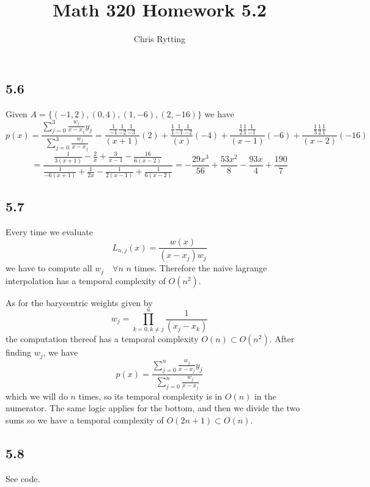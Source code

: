 \documentclass[letterpaper,12pt]{article}
\title{Math 320 Homework 5.2}
\author{Chris Rytting}
\theoremstyle{definition}
\begin{document}
\maketitle
\subsection*{5.6}


Given $A = \{(-1,2),(0,4),(1,-6),(2,-16)\}$  we have
\[p(x) = \frac{\sum_{j=0}^3 \frac{w_j}{x-x_j}y_j}{\sum_{j=0}^3 \frac{w_j}{x-x_j}}= \frac{\frac{1}{-1}\frac{1}{-2}\frac{1}{-3}}{(x+1)}(2) + \frac{\frac{1}{1}\frac{1}{-1}\frac{1}{-2}}{(x)}(-4)+\frac{\frac{1}{2}\frac{1}{1}\frac{1}{-1}}{(x-1)}(-6)+ \frac{\frac{1}{3}\frac{1}{2}\frac{1}{1}}{(x-2)}(-16)\]
\[=\frac{\frac{1}{3(x+1)}-\frac{2}{x}+\frac{3}{x-1}-\frac{16}{6(x-2)}}{\frac{1}{-6(x+1)}+\frac{1}{2x}-\frac{1}{2(x-1)}+\frac{1}{6(x-2)}}=-\frac{29x^3}{56}+\frac{53x^2}{8}-\frac{93x}{4}+\frac{190}{7}\]


\subsection*{5.7}
Every time we evaluate
\[L_{n,j}(x) = \frac{w(x)}{(x-x_j)w_j}\]
we have to compute all $w_j \quad \forall n$ $n$ times. Therefore the naive lagrange interpolation has a temporal complexity of $O(n^2)$.

As for the barycentric weights given by
\[w_j = \prod_{k=0 , k\not=j}^n\frac{1}{(x_j-x_k)}\]
the computation thereof has a temporal complexity $O(n) \subset O(n^2)$.
After finding $w_j$, we have
\[p(x) = \frac{\sum_{j=0}^n \frac{w_j}{x-x_j}y_j}{\sum_{j=0}^n \frac{w_j}{x-x_j}}\]
which we will do $n $ times, so its temporal complexity is in $O(n)$ in the numerator. The same logic applies for the bottom, and then we divide the two sums so we have a temporal complexity of $O(2n+1) \subset O(n)$.
\subsection*{5.8}
See code.
\end{document}
